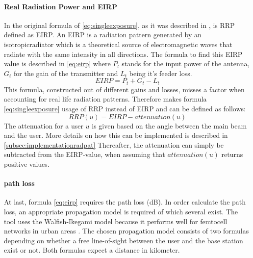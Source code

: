 \paragraph{Real Radiation Power and EIRP}
In the original formula of \ref{eq:singleexposure}, as it was described in \cite{J1, J6_originalExposureFormula}, 
is \gls{RRP} defined as \gls{EIRP}. An \gls{EIRP} is a radiation pattern generated by an \gls{isotropicradiator} which is
a theoretical source of electromagnetic waves that radiate with the same intensity in all directions. 
The formula to find this \gls{EIRP} value is described in \ref{eq:eirp}
where $P_t$ stands for the input power of the antenna, $G_t$ for the gain of the transmitter and $L_t$ being it's feeder loss.
\begin{equation}
EIRP = P_t + G_t - L_t
\label{eq:eirp}
\end{equation}
This formula, constructed out of different gains and losses, misses a factor when accounting for real life radiation patterns.
Therefore makes formula \ref{eq:singleexposure} usage of \gls{RRP} instead of \gls{EIRP} and can be defined as follows:
\begin{equation}
RRP(u) = EIRP - attenuation(u)
\label{eq:rrp}
\end{equation}
The attenuation for a user $u$ is given based on the angle between the main beam and the user. More details on how this can be implemented is described in \ref{subsec:implementationradpat}
Thereafter, the attenuation can simply be subtracted from the EIRP-value, when assuming that $attenuation(u)$ returns positive values.
\paragraph{path loss}
\label{subsec:pl}
At last, formula \ref{eq:eirp} requires the path loss (dB). In order calculate the path loss, an appropriate propagation model is required of which several exist.
The tool uses the Walfish-Ikegami model because it performs well for femtocell networks in urban areas \cite{J2}. %
The chosen propagation model consists of two formulas depending on whether a free line-of-sight between the user and the base station exist or not. Both formulas expect a distance in kilometer. %

